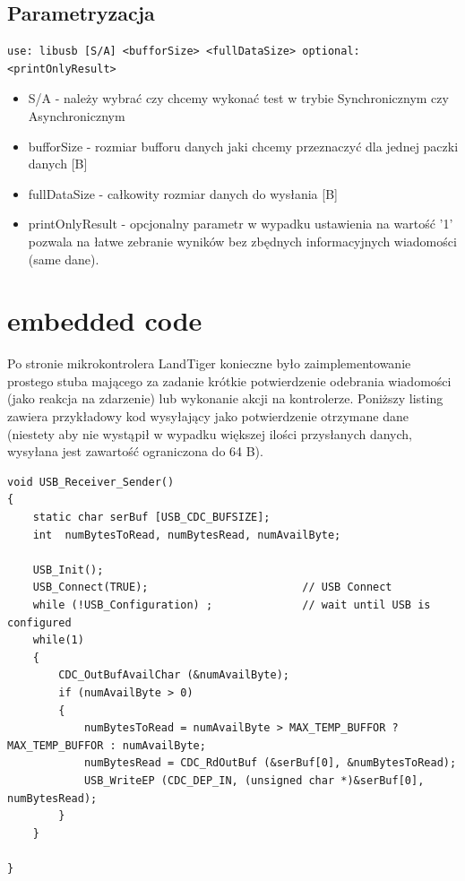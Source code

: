 \documentclass{BscUS}
\begin{document}
\subsection{Parametryzacja}
\begin{lstlisting}[caption={uruchomienie testu}]
use: libusb [S/A] <bufforSize> <fullDataSize> optional:<printOnlyResult>
\end{lstlisting}
\begin{itemize}
\item S/A - należy wybrać czy chcemy wykonać test w trybie Synchronicznym czy Asynchronicznym
\item bufforSize - rozmiar bufforu danych jaki chcemy przeznaczyć dla jednej paczki danych [B]
\item fullDataSize - całkowity rozmiar danych do wysłania [B]
\item printOnlyResult - opcjonalny parametr w wypadku ustawienia na wartość '1' pozwala na łatwe zebranie wyników bez zbędnych informacyjnych wiadomości (same dane). 
\end{itemize}
\section{embedded code}
Po stronie mikrokontrolera LandTiger konieczne było zaimplementowanie prostego stuba mającego za zadanie krótkie potwierdzenie odebrania wiadomości (jako reakcja na zdarzenie) lub wykonanie akcji na kontrolerze. Poniższy listing zawiera przykładowy kod wysyłający jako potwierdzenie otrzymane dane (niestety aby nie wystąpił w wypadku większej ilości przysłanych danych, wysyłana jest zawartość ograniczona do 64 B). \cite{embeddedC, embeddedSystems, bootstrapLinUSB}
\begin{lstlisting}[caption={Funkcja USB\_Receiver\_Sender},label={lst:FUSBSenderReceiver}]
void USB_Receiver_Sender()
{
	static char serBuf [USB_CDC_BUFSIZE];
	int  numBytesToRead, numBytesRead, numAvailByte;

	USB_Init();
	USB_Connect(TRUE);                        // USB Connect
	while (!USB_Configuration) ;              // wait until USB is configured
	while(1)
	{
		CDC_OutBufAvailChar (&numAvailByte);
		if (numAvailByte > 0)
		{
		  	numBytesToRead = numAvailByte > MAX_TEMP_BUFFOR ? MAX_TEMP_BUFFOR : numAvailByte;
		    numBytesRead = CDC_RdOutBuf (&serBuf[0], &numBytesToRead);
		    USB_WriteEP (CDC_DEP_IN, (unsigned char *)&serBuf[0], numBytesRead);
		}
	}

}
\end{lstlisting}
\end{document}
